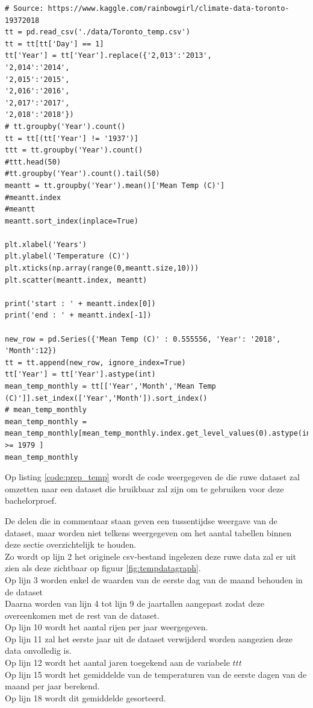 \clearpage
{}
\label{code:prep_temp}
\begin{verbatim}
# Source: https://www.kaggle.com/rainbowgirl/climate-data-toronto-19372018
tt = pd.read_csv('./data/Toronto_temp.csv')
tt = tt[tt['Day'] == 1]
tt['Year'] = tt['Year'].replace({'2,013':'2013',
'2,014':'2014',
'2,015':'2015',
'2,016':'2016',
'2,017':'2017',
'2,018':'2018'})
# tt.groupby('Year').count()
tt = tt[(tt['Year'] != '1937')]
ttt = tt.groupby('Year').count()
#ttt.head(50)
#tt.groupby('Year').count().tail(50)
meantt = tt.groupby('Year').mean()['Mean Temp (C)']
#meantt.index
#meantt
meantt.sort_index(inplace=True)

plt.xlabel('Years')
plt.ylabel('Temperature (C)')
plt.xticks(np.array(range(0,meantt.size,10)))
plt.scatter(meantt.index, meantt)

print('start : ' + meantt.index[0])
print('end : ' + meantt.index[-1])

new_row = pd.Series({'Mean Temp (C)' : 0.555556, 'Year': '2018', 'Month':12})
tt = tt.append(new_row, ignore_index=True)
tt['Year'] = tt['Year'].astype(int)
mean_temp_monthly = tt[['Year','Month','Mean Temp (C)']].set_index(['Year','Month']).sort_index()
# mean_temp_monthly
mean_temp_monthly = mean_temp_monthly[mean_temp_monthly.index.get_level_values(0).astype(int) >= 1979 ]
mean_temp_monthly
\end{verbatim}

Op listing \ref{code:prep_temp} wordt de code weergegeven de die ruwe dataset zal omzetten naar een dataset die bruikbaar zal zijn om te gebruiken voor deze bachelorproef. 


De delen die in commentaar staan geven een tussentijdse weergave van de dataset, maar worden niet telkens weergegeven om het aantal tabellen binnen deze sectie overzichtelijk te houden. \\


Zo wordt op lijn 2 het originele csv-bestand ingelezen deze ruwe data zal er uit zien als deze zichtbaar op figuur \ref{fig:tempdatagraph}. \\
Op lijn 3 worden enkel de waarden van de eerste dag van de maand behouden in de dataset \\
Daarna worden van lijn 4 tot lijn 9 de jaartallen aangepast zodat deze overeenkomen met de rest van de dataset. \\
Op lijn 10 wordt het aantal rijen per jaar weergegeven. \\
Op lijn 11 zal het eerste jaar uit de dataset verwijderd worden aangezien deze data onvolledig is. \\
Op lijn 12 wordt het aantal jaren toegekend aan de variabele $ttt$ \\
Op lijn 15 wordt het gemiddelde van de temperaturen van de eerste dagen van de maand per jaar berekend. \\
Op lijn 18 wordt dit gemiddelde gesorteerd. \\



